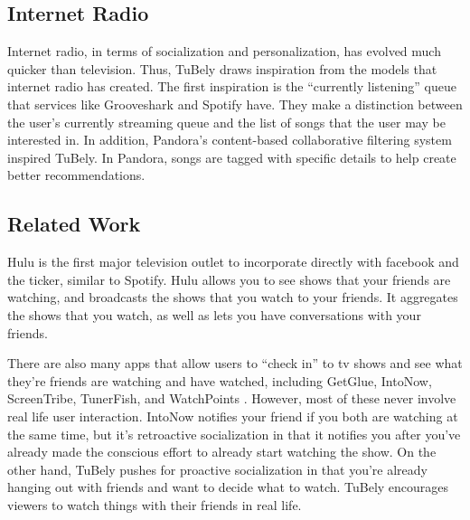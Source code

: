 \subsection{Internet Radio}
Internet radio, in terms of socialization and personalization, has
evolved much quicker than television.  Thus, TuBely draws inspiration
from the models that internet radio has created.  The first
inspiration is the “currently listening” queue that services like
Grooveshark \cite{grooveshark} and Spotify \cite{spotify} have.  They
make a distinction between the user’s currently streaming queue and
the list of songs that the user may be interested in.  In addition,
Pandora’s \cite{pandora} content-based collaborative filtering system
inspired TuBely.  In Pandora, songs are tagged with specific details
to help create better recommendations.

\subsection{Related Work}
Hulu is the first major television outlet to incorporate directly with
facebook and the ticker, similar to Spotify.  Hulu allows you to see
shows that your friends are watching, and broadcasts the shows that
you watch to your friends.  It aggregates the shows that you watch, as
well as lets you have conversations with your friends.

There are also many apps that allow users to “check in” to tv shows
and see what they’re friends are watching and have watched, including
GetGlue, IntoNow, ScreenTribe, TunerFish, and WatchPoints
\cite{chausse}.  However, most of these never involve real life user
interaction.  IntoNow notifies your friend if you both are watching at
the same time, but it’s retroactive socialization in that it notifies
you after you’ve already made the conscious effort to already start
watching the show.  On the other hand, TuBely pushes for proactive
socialization in that you’re already hanging out with friends and want
to decide what to watch.  TuBely encourages viewers to watch things
with their friends in real life.
